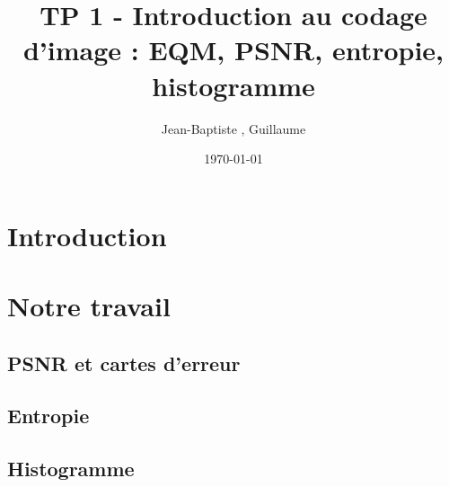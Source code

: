 \documentclass[12pt]{report}
\title{TP 1 - Introduction au codage d'image : EQM, PSNR, entropie, histogramme}
\author{Jean-Baptiste \bsc{Morice}, Guillaume \bsc{Versal}}
\date{\today}
\begin{document}
\maketitle

\tableofcontents

\newpage
\section*{Introduction}

\section{Notre travail}

\subsection{PSNR et cartes d'erreur}

\subsection{Entropie}

\subsection{Histogramme}

\begin{comment}


\renewcommand{\contentsname}{\large Sommaire} %
\setcounter{tocdepth}{2} %
\tableofcontents
\newpage

\end{comment}

\newpage



\renewcommand*\listfigurename{\large Liste des figures}
\listoffigures
\newpage
\end{document}
